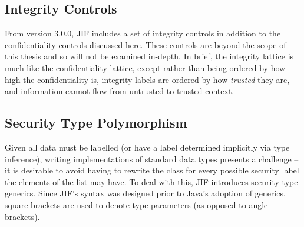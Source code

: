 %
%	
%	
%		
%
%
%	
%	
%	
%	
%	

\subsection{Integrity Controls}

From version 3.0.0, JIF includes a set of integrity controls in addition to the confidentiality controls discussed here. These controls are beyond the scope of this thesis and so will not be examined in-depth. In brief, the integrity lattice is much like the confidentiality lattice, except rather than being ordered by how high the confidentiality is, integrity labels are ordered by how \textit{trusted} they are, and information cannot flow from untrusted to trusted context.

\subsection{Security Type Polymorphism}

Given all data must be labelled (or have a label determined implicitly via type inference), writing implementations of standard data types presents a challenge -- it is desirable to avoid having to rewrite the  class for every possible security label the elements of the list may have. To deal with this, JIF introduces security type generics. Since JIF's syntax was designed prior to Java's adoption of generics, square brackets are used to denote type parameters (as opposed to angle brackets).

